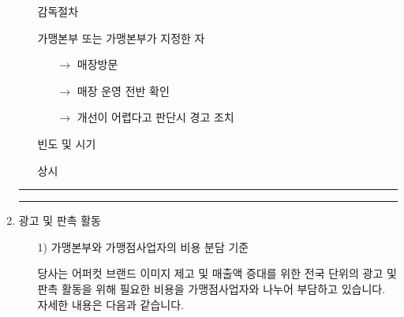 \documentclass[a5paper,10pt]{oblivoir}
\newcommand\crule[3][black]{\textcolor{#1}{\rule{#2}{#3}}}
\begin{document}
\begin{enumerate}
\begin{enumerate}
\begin{tiny}
\begin{Form}
  감독절차

\noindent\dotfill 
 가맹본부 또는 가맹본부가 지정한 자

\begin{itemize}
\item[$\to$] 매장방문
\item[$\to$] 매장 운영 전반 확인
\item[$\to$]  개선이 어렵다고 판단시 경고 조치
\end{itemize}


 빈도 및 시기

\noindent\dotfill 
 상시
\\
\end{Form}
\end{tiny}
\end{enumerate}
\newpage
\begin{center}
\crule[red]{4cm}{0.1cm} \crule[blue]{4cm}{0.1cm}
\end{center}
\item 광고 및 판촉 활동
\begin{enumerate}
\item[1)] 가맹본부와 가맹점사업자의 비용 분담 기준

당사는 어퍼컷 브랜드 이미지 제고 및 매출액 증대를 위한 전국 단위의 광고 및 판촉 활동을 위해 필요한 비용을 가맹점사업자와 나누어 부담하고 있습니다. 자세한 내용은 다음과 같습니다.


\end{enumerate}
\end{enumerate}
\end{document}
